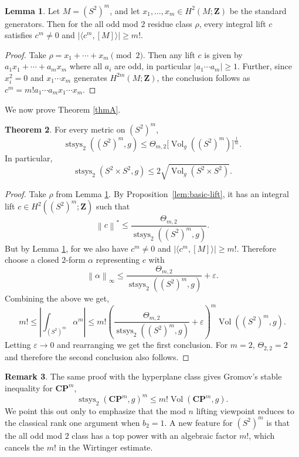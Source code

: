 \documentclass[11pt,reqno]{amsart}
\numberwithin{equation}{section}
\numberwithin{equation}{section}
\theoremstyle{definition}
\newtheorem{theorem}{Theorem}[section]
\newtheorem{lemma}[theorem]{Lemma}
\newtheorem{remark}[theorem]{Remark}
\newcommand{\Z}{\mathbf Z}
\newcommand{\CP}{\mathbf{CP}}
\DeclareMathOperator{\Vol}{Vol}
\DeclareMathOperator{\stsys}{stsys}
\newcommand{\norm}[1]{\left\lVert #1\right\rVert}
\begin{document}
\begin{lemma}\label{lem:all-odd-class}
Let \(M=(S^2)^m\), and let \(x_1,\ldots,x_m\in H^2(M;\Z)\) be the standard generators. Then for the all odd mod $2$ residue class $\rho$, every integral lift $c$ satisfies \(c^m \neq 0 \) and \( \left|\langle c^m,[M]\rangle\right|\ge m!.\)
\end{lemma}
\begin{proof}
Take $\rho = x_1 + \cdots + x_m\pmod2$. Then any lift $c$ is given by $ a_1x_1 + \cdots+a_mx_m$ where all $a_i$ are odd, in particular $|a_1 \cdots a_m| \geq 1$. Further, since \(x_i^2=0\) and \(x_1\cdots x_m\) generates \(H^{2m}(M;\Z)\), the conclusion follows as $c^m = m! a_1\cdots a_mx_1\cdots x_m$.
\end{proof}

We now prove Theorem \ref{thmA}.

\begin{theorem}\label{prop:product-spheres-no-curv}
For every metric on \((S^2)^m\),
\[
\stsys_2((S^2)^m,g)
\le
\Theta_{m,2}\big[\Vol_g((S^2)^m)\big]^{\frac{1}{m}}.
\]
In particular,
\[
\stsys_2(S^2\times S^2,g)
\le
2\sqrt{\Vol_g(S^2\times S^2)}.
\]
\end{theorem}

\begin{proof}
Take $\rho$ from Lemma \ref{lem:all-odd-class}. By Proposition~\ref{lem:basic-lift}, it has an integral lift \(c\in H^2((S^2)^m;\Z)\) such that
\[
\norm{c}^{\ast}
\le
\frac{\Theta_{m,2}}{\stsys_2((S^2)^m,g)}.
\]
But by Lemma \ref{lem:all-odd-class}, for we also have  \(c^m \neq 0 \) and \( \left|\langle c^m,[M]\rangle\right|\ge m!.\) Therefore choose a closed \(2\)-form \(\alpha\) representing \(c\) with
\[
\norm{\alpha}_\infty
\le
\frac{\Theta_{m,2}}{\stsys_2((S^2)^m,g)}+\varepsilon.
\]
Combining the above we get,
\[
m!
\le
\left|\int_{(S^2)^m}\alpha^m\right|
\le
m!\left(
\frac{\Theta_{m,2}}{\stsys_2((S^2)^m,g)}+\varepsilon
\right)^m
\Vol((S^2)^m,g).
\]
 Letting \(\varepsilon\to0\) and rearranging we get the first conclusion. For $m=2$, \(\Theta_{2,2}=2\) and therefore the second conclusion also follows. 
\end{proof}

\begin{remark}
The same proof with the hyperplane class gives Gromov's stable inequality for \(\CP^m\),
\[
\stsys_2(\CP^m,g)^m\le m!\Vol(\CP^m,g).
\]
We point this out only to emphasize that the mod \(n\) lifting viewpoint reduces to the classical rank one argument when \(b_2=1\). A new feature for \((S^2)^m\) is that the all odd mod \(2\) class has a top power with an algebraic factor \(m!\), which cancels the \(m!\) in the Wirtinger estimate.
\end{remark}
\end{document}

